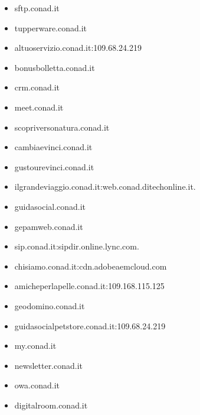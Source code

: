 \documentclass{article}
\begin{document}
\begin{itemize}
        \item sftp.conad.it
    
        \item tupperware.conad.it
    
        \item altuoservizio.conad.it:109.68.24.219
    
        \item bonusbolletta.conad.it
    
        \item crm.conad.it
    
        \item meet.conad.it
    
        \item scopriversonatura.conad.it
    
        \item cambiaevinci.conad.it
    
        \item gustourevinci.conad.it
    
        \item ilgrandeviaggio.conad.it:web.conad.ditechonline.it.
    
        \item guidasocial.conad.it
    
        \item gepamweb.conad.it
    
        \item sip.conad.it:sipdir.online.lync.com.
    
        \item chisiamo.conad.it:cdn.adobeaemcloud.com
    
        \item amicheperlapelle.conad.it:109.168.115.125
    
        \item geodomino.conad.it
    
        \item guidasocialpetstore.conad.it:109.68.24.219
    
        \item my.conad.it
    
        \item newsletter.conad.it
    
        \item owa.conad.it
    
        \item digitalroom.conad.it
    

\end{itemize}
\end{document}
